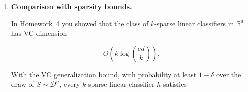 \documentclass[11pt]{article}
\begin{document}
\begin{enumerate}
\begin{solutionbox}
Since
\[
|\mathcal F|=2d,
\]
we obtain
\[
\widehat{\mathcal R}_S(\mathcal F)
\le
R
\sqrt{
\frac{2\log(2d)}{n}
}.
\]

Substituting into the previous inequality gives
\[
\widehat{\mathcal R}_S(\mathcal H_B^1)
\le
B
\left(
R
\sqrt{
\frac{2\log(2d)}{n}
}
\right).
\]

Therefore,
\[
\boxed{
\widehat{\mathcal R}_S(\mathcal H_B^1)
\le
BR
\sqrt{
\frac{2\log(2d)}{n}
}.
}
\]

\medskip

\textbf{Interpretation.}

This bound is extremely important because it shows that the complexity of the $\\ell_1$ ball depends only logarithmically on dimension.

In many high-dimensional learning problems:
\begin{itemize}
    \item the ambient dimension $d$ may be extremely large,
    \item sparse or approximately sparse predictors are still learnable,
    \item controlling the $\\ell_1$ norm is enough to control generalization.
\end{itemize}

The logarithmic dependence
\[
\log d
\]
is dramatically smaller than polynomial dependence on $d$.

This is one of the main theoretical reasons why:
\begin{itemize}
    \item sparse learning,
    \item Lasso-type methods,
    \item boosting methods,
    \item high-dimensional linear prediction
\end{itemize}
can generalize effectively even when
\[
d\gg n.
\]

\end{solutionbox}

\item \textbf{Comparison with sparsity bounds.}

In Homework~4 you showed that the class of $k$-sparse linear classifiers in 
$\mathbb{R}^d$ has VC dimension 


\[
O\!\left(k \log\!\left(\frac{e d}{k}\right)\right).
\]


With the VC generalization bound, with probability at least $1 - \delta$ over the draw 
of $S \sim \mathcal{D}^n$, every $k$-sparse linear classifier $h$ satisfies



\end{enumerate}
\end{document}
